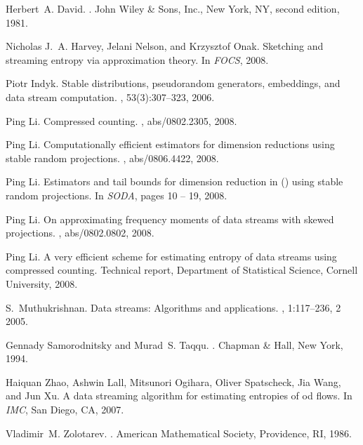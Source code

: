 \documentclass[oneside,10pt]{article}
\begin{document}
\appendix
{\small
\begin{thebibliography}{10}

Herbert~A. David.
.
\newblock John Wiley \& Sons, Inc., New York, NY, second edition, 1981.

Nicholas J.~A. Harvey, Jelani Nelson, and Krzysztof Onak.
\newblock Sketching and streaming entropy via approximation theory.
\newblock In {\em FOCS}, 2008.

Piotr Indyk.
\newblock Stable distributions, pseudorandom generators, embeddings, and data
  stream computation.
, 53(3):307--323, 2006.

Ping Li.
\newblock Compressed counting.
, abs/0802.2305, 2008.

Ping Li.
\newblock Computationally efficient estimators for dimension reductions using
  stable random projections.
, abs/0806.4422, 2008.

Ping Li.
\newblock Estimators and tail bounds for dimension reduction in 
  () using stable random projections.
\newblock In {\em SODA}, pages 10 -- 19, 2008.

Ping Li.
\newblock On approximating frequency moments of data streams with skewed
  projections.
, abs/0802.0802, 2008.

Ping Li.
\newblock A very efficient scheme for estimating entropy of data streams using
  compressed counting.
\newblock Technical report, Department of Statistical Science, Cornell
  University, 2008.

S.~Muthukrishnan.
\newblock Data streams: Algorithms and applications.
,
  1:117--236, 2 2005.

Gennady Samorodnitsky and Murad~S. Taqqu.
.
\newblock Chapman \& Hall, New York, 1994.

Haiquan Zhao, Ashwin Lall, Mitsunori Ogihara, Oliver Spatscheck, Jia Wang, and
  Jun Xu.
\newblock A data streaming algorithm for estimating entropies of od flows.
\newblock In {\em IMC}, San Diego, CA, 2007.

Vladimir~M. Zolotarev.
.
\newblock American Mathematical Society, Providence, RI, 1986.

\end{thebibliography}

}
\end{document}
